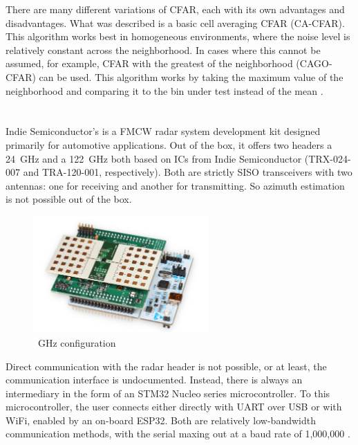 There are many different variations of CFAR, each with its own advantages and disadvantages.
What was described is a basic cell averaging CFAR (CA-CFAR).
This algorithm works best in homogeneous environments, where the noise level is relatively constant across the neighborhood.
In cases where this cannot be assumed, for example, CFAR with the greatest of the neighborhood (CAGO-CFAR) can be used.
This algorithm works by taking the maximum value of the neighborhood and comparing it to the bin under test instead of the mean \cite{rohling1983}.

\chapter{\sirad}

Indie Semiconductor's \sirad is a FMCW radar system development kit designed primarily for automotive applications.
Out of the box, it offers two headers a 24~GHz and a 122~GHz both based on ICs from Indie Semiconductor (TRX-024-007 and TRA-120-001, respectively).
Both are strictly SISO transceivers with two antennas: one for receiving and another for transmitting.
So azimuth estimation is not possible out of the box.

\begin{figure}[h!]
  \centering
  \includegraphics[width=0.6\textwidth]{../img/sirad.png}

  \caption[~GHz configuration \cite{siradMANOld}]{~GHz configuration \cite{siradMANOld}}
  \label{fig:sirad}
\end{figure}

Direct communication with the radar header is not possible, or at least, the communication interface is undocumented.
Instead, there is always an intermediary in the form of an STM32 Nucleo series microcontroller.
To this microcontroller, the user connects either directly with UART over USB or with WiFi, enabled by an on-board ESP32.
Both are relatively low-bandwidth communication methods, with the serial maxing out at a baud rate of 1,000,000 \cite{siradMAN}.

